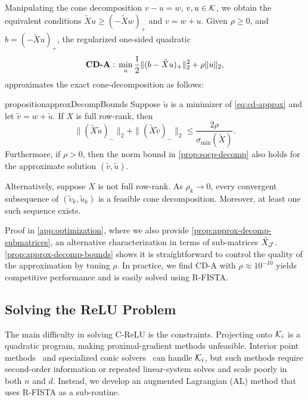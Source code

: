 Manipulating the cone decomposition \( v - u = w \), \( v, u \in \mathcal{K} \), we
obtain the equivalent conditions \( \tilde X u \geq (-\tilde X w)_+ \) and
\( v = w + u \).
Given \( \rho \geq 0 \), and \( b = (-\tilde X u)_+ \), the regularized
one-sided quadratic
\begin{equation}\label{eq:cd-approx}
    \textbf{CD-A}: \, \min_{u} \frac 1 2
    \|
    (b - \tilde X u)_+
    \|_2^2
    + \rho \|u\|_2,
\end{equation}
approximates the exact cone-decomposition as follows:
\begin{restatable}{proposition}{approxDecompBounds}\label{prop:approx-decomp-bounds}
    Suppose \( \tilde u \) is a minimizer of \eqref{eq:cd-approx} and let \(
    \tilde v = w + \tilde u \).
    If \( X \) is full row-rank, then
    \[
        \|(\tilde X \tilde u)_-\|_2 + \|(\tilde X \tilde v)_-\|_2
        \leq \frac{2\rho}{\sigma_{\text{min}}(\tilde X)}.
    \]
    Furthermore, if \( \rho > 0 \), then the norm bound in
    \cref{prop:socp-decomp} also holds for the approximate solution
    \( (\tilde v, \tilde u) \).

    Alternatively, suppose \( X \) is not full row-rank.
    As \( \rho_k \rightarrow 0 \), every convergent subsequence of
    \( (\tilde v_k, \tilde u_k) \) is a feasible cone decomposition.
    Moreover, at least one such sequence exists.
\end{restatable}
Proof in \cref{app:optimization}, where we also provide
\cref{prop:approx-decomp-submatrices}, an alternative characterization in terms
of sub-matrices \( \tilde X_{\mathcal{J}} \).
\autoref{prop:approx-decomp-bounds} shows it is straightforward to control the
quality of the approximation by tuning \( \rho \).
In practice, we find CD-A with \( \rho \approx 10^{-10} \) yields competitive
performance and is easily solved using R-FISTA.

\subsection{Solving the ReLU Problem}\label{sec:al-method}

The main difficulty in solving C-ReLU is the constraints.
Projecting onto \( \mathcal{K}_i \) is a quadratic program, making proximal-gradient
methods unfeasible.
Interior point methods~\citep{nesterov1994interior} and specialized conic
solvers~\citep{odonoghue2016scs} can handle \( \mathcal{K}_i \), but such methods
require second-order information or repeated linear-system solves and scale
poorly in both \( n \) and \( d \).
Instead, we develop an augmented Lagrangian (AL) method that uses R-FISTA as a
sub-routine.

